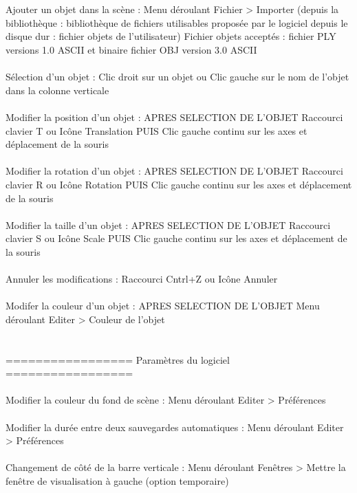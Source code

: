 \\ \\
Ajouter un objet dans la scène : 	Menu déroulant Fichier > Importer
	   	      	       		     (depuis la bibliothèque : bibliothèque de fichiers utilisables proposée par le logiciel
					      depuis le disque dur   : fichier objets de l'utilisateur)
		Fichier objets acceptés : fichier PLY versions 1.0 ASCII et binaire
			       		  fichier OBJ version  3.0 ASCII
\\ \\
Sélection d'un objet :			Clic droit sur un objet
	       	     			ou     Clic gauche sur le nom de l'objet dans la colonne verticale
\\ \\
Modifier la position d'un objet :	APRES SELECTION DE L'OBJET
	    	     	  		Raccourci clavier T
					ou     Icône Translation
					PUIS Clic gauche continu sur les axes et déplacement de la souris
\\ \\
Modifier la rotation d'un objet :	APRES SELECTION DE L'OBJET
	    	     	  		Raccourci clavier R
					ou     Icône Rotation
					PUIS Clic gauche continu sur les axes et déplacement de la souris
\\ \\
Modifier la taille d'un objet :		APRES SELECTION DE L'OBJET
	    	     	  		Raccourci clavier S
					ou     Icône Scale
					PUIS Clic gauche continu sur les axes et déplacement de la souris
\\ \\
Annuler les modifications :		Raccourci Cntrl+Z
	    		  		ou     Icône Annuler
\\ \\
Modifer la couleur d'un objet :		APRES SELECTION DE L'OBJET
	   	   	      		Menu déroulant Editer > Couleur de l'objet
\\ \\ \\
================= Paramètres du logiciel =================
\\ \\
Modifier la couleur du fond de scène :	Menu déroulant Editer > Préférences
\\ \\
Modifier la durée entre deux 
	 sauvegardes automatiques :	Menu déroulant Editer > Préférences
\\ \\
Changement de côté de la barre 
	 verticale :			Menu déroulant Fenêtres > Mettre la fenêtre de visualisation à gauche (option temporaire)
